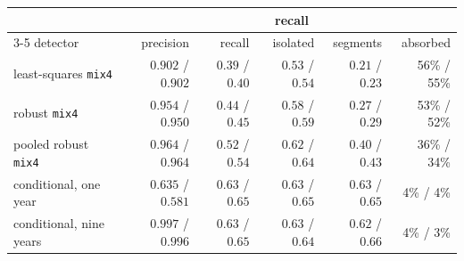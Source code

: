 \begin{tabular}{lrrrrr}
\toprule
& & \multicolumn{3}{c}{recall} & \\
\cmidrule(lr){3-5}
detector & precision & recall & isolated & segments & absorbed \\
\midrule
least-squares \texttt{mix4} & $0.902$ / $0.902$ & $0.39$ / $0.40$ & $0.53$ / $0.54$ & $0.21$ / $0.23$ & 56\% / 55\% \\
robust \texttt{mix4} & $0.954$ / $0.950$ & $0.44$ / $0.45$ & $0.58$ / $0.59$ & $0.27$ / $0.29$ & 53\% / 52\% \\
pooled robust \texttt{mix4} & $0.964$ / $0.964$ & $0.52$ / $0.54$ & $0.62$ / $0.64$ & $0.40$ / $0.43$ & 36\% / 34\% \\
conditional, one year & $0.635$ / $0.581$ & $0.63$ / $0.65$ & $\mathbf{0.63}$ / $\mathbf{0.65}$ & $0.63$ / $0.65$ & 4\% / 4\% \\
conditional, nine years & $\mathbf{0.997}$ / $\mathbf{0.996}$ & $\mathbf{0.63}$ / $\mathbf{0.65}$ & $0.63$ / $0.64$ & $\mathbf{0.62}$ / $\mathbf{0.66}$ & 4\% / 3\% \\
\bottomrule
\end{tabular}
